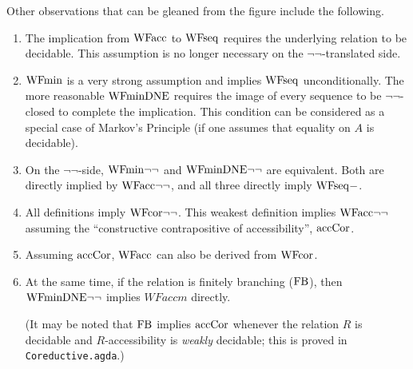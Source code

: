 Other observations that can be gleaned from the figure include the following.
\begin{enumerate}
  \item The implication from $\mathrm{WFacc}$ to $\mathrm{WFseq}$ requires the underlying relation to be decidable.
    This assumption is no longer necessary on the $\lnot\lnot$-translated side.
  \item $\mathrm{WFmin}$ is a very strong assumption and implies $\mathrm{WFseq}$ unconditionally.
  The more reasonable $\mathrm{WFminDNE}$ requires the image of every sequence to be $\lnot\lnot$-closed
  to complete the implication.  This condition can be considered as a special case of Markov's Principle
  (if one assumes that equality on $A$ is decidable).
  \item On the $\lnot\lnot$-side, $\mathrm{WFmin}{\lnot\lnot}$ and $\mathrm{WFminDNE}{\lnot\lnot}$ are equivalent. Both are directly implied by $\mathrm{WFacc}{\lnot\lnot}$,
    and all three directly imply $\mathrm{WFseq}{-}$.
  \item All definitions imply $\mathrm{WFcor}{\lnot\lnot}$.  This weakest definition implies $\mathrm{WFacc}{\lnot\lnot}$ assuming the
    ``constructive contrapositive of accessibility'', $\mathrm{accCor}$.
  \item Assuming $\mathrm{accCor}$, $\mathrm{WFacc}$ can also be derived from $\mathrm{WFcor}$. %


  \item At the same time, if the relation is finitely branching ($\mathrm{FB}$), then $\mathrm{WFminDNE}{\lnot\lnot}$
    implies $WFaccm$ directly.

    (It may be noted that $\mathrm{FB}$ implies $\mathrm{accCor}$ whenever the relation $R$ is decidable
    and $R$-accessibility is \emph{weakly} decidable;  this is proved in \texttt{Coreductive.agda}.)


\end{enumerate}
